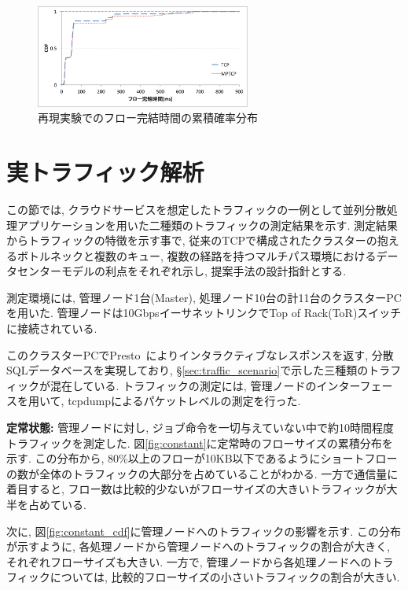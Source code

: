 \begin{figure}[t]
    \begin{center}
    \includegraphics[autoebb, width=200pt]{./img/cdf_rep.pdf}
    \caption{再現実験でのフロー完結時間の累積確率分布}
    \label{fig:cdf}
    \end{center}
\end{figure}





\section{実トラフィック解析}

この節では, クラウドサービスを想定したトラフィックの一例として並列分散処理アプリケーションを用いた二種類のトラフィックの測定結果を示す.
測定結果からトラフィックの特徴を示す事で, 従来のTCPで構成されたクラスターの抱えるボトルネックと複数のキュー,
複数の経路を持つマルチパス環境におけるデータセンターモデルの利点をそれぞれ示し, 提案手法の設計指針とする.

測定環境には, 管理ノード1台(Master), 処理ノード10台の計11台のクラスターPCを用いた.
管理ノードは10GbpsイーサネットリンクでTop of Rack(ToR)スイッチに接続されている.

このクラスターPCでPresto~\cite{presto}によりインタラクティブなレスポンスを返す, 分散SQLデータベースを実現しており,
\S \ref{sec:traffic_scenario}で示した三種類のトラフィックが混在している.
トラフィックの測定には, 管理ノードのインターフェースを用いて, tcpdump\cite{tcpdump}によるパケットレベルの測定を行った.

{\bf 定常状態: }
管理ノードに対し, ジョブ命令を一切与えていない中で約10時間程度トラフィックを測定した.
図\ref{fig:constant}に定常時のフローサイズの累積分布を示す.
この分布から, 80\%以上のフローが10KB以下であるようにショートフローの数が全体のトラフィックの大部分を占めていることがわかる.
一方で通信量に着目すると, フロー数は比較的少ないがフローサイズの大きいトラフィックが大半を占めている.

次に, 図\ref{fig:constant_cdf}に管理ノードへのトラフィックの影響を示す.
この分布が示すように, 各処理ノードから管理ノードへのトラフィックの割合が大きく, それぞれフローサイズも大きい.
一方で, 管理ノードから各処理ノードへのトラフィックについては, 比較的フローサイズの小さいトラフィックの割合が大きい.

